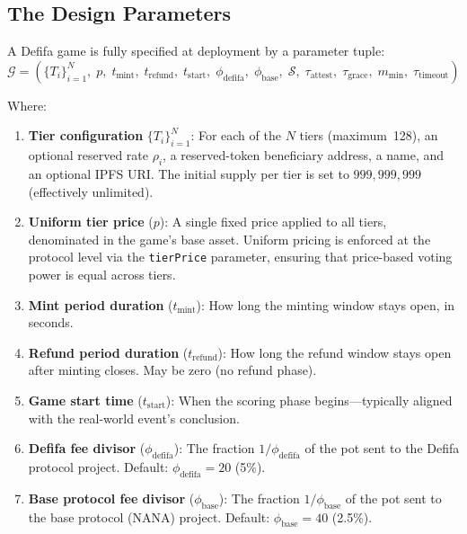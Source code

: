 \documentclass[11pt,a4paper]{article}
\begin{document}
\subsection{The Design Parameters}

A Defifa game is fully specified at deployment by a parameter tuple:
\begin{equation}
\mathcal{G} = \left( \{T_i\}_{i=1}^{N}, \; p, \; t_{\text{mint}}, \; t_{\text{refund}}, \; t_{\text{start}}, \; \phi_{\text{defifa}}, \; \phi_{\text{base}}, \; \mathcal{S}, \; \tau_{\text{attest}}, \; \tau_{\text{grace}}, \; m_{\text{min}}, \; \tau_{\text{timeout}} \right)
\end{equation}

Where:
\begin{enumerate}[nosep]
    \item \textbf{Tier configuration} $\{T_i\}_{i=1}^{N}$: For each of the $N$ tiers (maximum~128), an optional reserved rate $\rho_i$, a reserved-token beneficiary address, a name, and an optional IPFS URI. The initial supply per tier is set to $999{,}999{,}999$ (effectively unlimited).

    \item \textbf{Uniform tier price} ($p$): A single fixed price applied to all tiers, denominated in the game's base asset. Uniform pricing is enforced at the protocol level via the \texttt{tierPrice} parameter, ensuring that price-based voting power is equal across tiers.

    \item \textbf{Mint period duration} ($t_{\text{mint}}$): How long the minting window stays open, in seconds.

    \item \textbf{Refund period duration} ($t_{\text{refund}}$): How long the refund window stays open after minting closes. May be zero (no refund phase).

    \item \textbf{Game start time} ($t_{\text{start}}$): When the scoring phase begins---typically aligned with the real-world event's conclusion.

    \item \textbf{Defifa fee divisor} ($\phi_{\text{defifa}}$): The fraction $1/\phi_{\text{defifa}}$ of the pot sent to the Defifa protocol project. Default: $\phi_{\text{defifa}} = 20$ (5\%).

    \item \textbf{Base protocol fee divisor} ($\phi_{\text{base}}$): The fraction $1/\phi_{\text{base}}$ of the pot sent to the base protocol (NANA) project. Default: $\phi_{\text{base}} = 40$ (2.5\%).


\end{enumerate}
\end{document}
